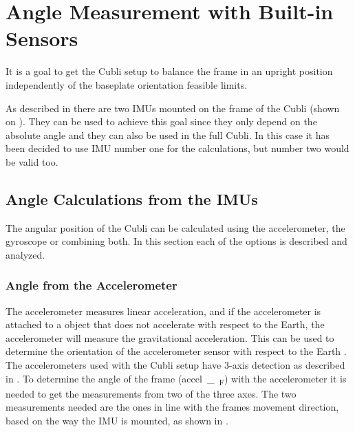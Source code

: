 \chapter{Angle Measurement with Built-in Sensors}\label{chap:CompFilter}
It is a goal to get the Cubli setup to balance the frame in an upright position independently of the baseplate orientation feasible limits.

As described in  there are two IMUs mounted on the frame of the Cubli (shown on ). They can be used to achieve this goal since they only depend on the absolute angle and they can also be used in the full Cubli. In this case it has been decided to use IMU number one for the calculations, but number two would be valid too.

\section{Angle Calculations from the IMUs}
The angular position of the Cubli can be calculated using the accelerometer, the gyroscope or combining both. In this section each of the options is described and analyzed.

\subsection{Angle from the Accelerometer}
The accelerometer measures linear acceleration, and if the accelerometer is attached to a object that does not accelerate with respect to the Earth, the accelerometer will measure the gravitational acceleration. This can be used to determine the orientation of the accelerometer sensor with respect to the Earth \cite{JWarren}.\\
The accelerometers used with the Cubli setup have 3-axis detection as described in . To determine the angle of the frame (\si{accel\_\theta_{F}}) with the accelerometer it is needed to get the measurements from two of the three axes. The two measurements needed are the ones in line with the frames movement direction, based on the way the IMU is mounted, as shown in . 

